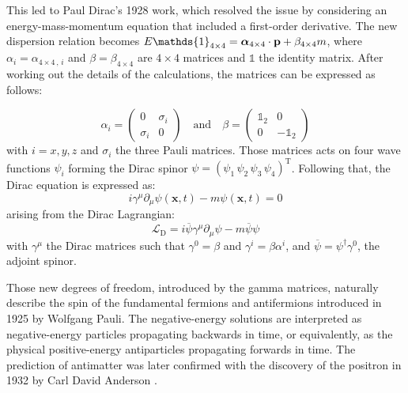 \vspace{0.5 cm}

This led to Paul Dirac's 1928 work, which resolved the issue by considering an energy-mass-momentum equation that included a first-order derivative. The new dispersion relation becomes $E\mathds{1}_{4\times4}=\mathbi{\alpha}_{4\times4}\cdot\textbf{p}+\beta_{4\times4}m$, where $\alpha_i=\alpha_{4\times4\,,\,i}$ and $\beta=\beta_{4\times4}$ are $4\times4$ matrices and $\mathds{1}$ the identity matrix. After working out the details of the calculations, the matrices can be expressed as follows:

\begin{equation}
    \alpha_i = \left( \begin{array}{cc} 0 & \sigma_i \\ \sigma_i & 0 \end{array} \right) 
    \quad \mathrm{and} \quad \beta= \left( \begin{array}{cc} \mathds{1}_2 & 0 \\ 0 & -\mathds{1}_2 \end{array} \right)
\end{equation}
with $i=x,y,z$ and $\sigma_i$ the three Pauli matrices. Those matrices acts on four wave functions $\psi_i$ forming the Dirac spinor $\psi=(\psi_1 \, \psi_2 \, \psi_3 \, \psi_4)^\mathrm{T}$. Following that, the Dirac equation is expressed as:
\begin{equation}
    i\gamma^\mu\partial_\mu\psi(\mathbf{x},t)-m\psi(\mathbf{x},t)=0
\end{equation}
arising from the Dirac Lagrangian:
\begin{equation}
    \mathcal{L}_\mathrm{D} = i \overline{\psi}\gamma^\mu \partial_\mu \psi - m \overline{\psi} \psi
\end{equation}
with $\gamma^\mu$ the Dirac matrices such that $\gamma^0=\beta$ and $\gamma^i=\beta\alpha^i$, and $\overline{\psi}=\psi^\dagger\gamma^0$, the adjoint spinor.

Those new degrees of freedom, introduced by the gamma matrices, naturally describe the spin of the fundamental fermions and antifermions introduced in 1925 by Wolfgang Pauli. The negative-energy solutions are interpreted as negative-energy particles propagating backwards in time, or equivalently, as the physical positive-energy antiparticles propagating forwards in time. The prediction of antimatter was later confirmed with the discovery of the positron in 1932 by Carl David Anderson \cite{Anderson1932}.

